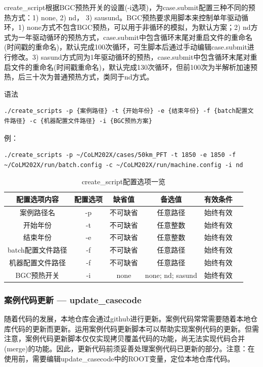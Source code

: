 create\_script根据BGC预热开关的设置(-i选项)，为case.submit配置三种不同的预热方式：1) none, 2) nd， 3) sausund。BGC预热要求用脚本来控制单年驱动循环，1) none方式不包含BGC预热，可以用于非循环的模拟，为默认方案；2) nd方式为一年驱动循环的预热方式，case.submit中包含循环末尾对重启文件的重命名(时间戳的重命名)，默认完成100次循环，可生脚本后通过手动编辑case.submit进行修改。3) sasund方式同为1年驱动循环的预热，case.submit中包含循环末尾对重启文件的重命名(时间戳重命名)，默认完成130次循环，但前100次为半解析加速预热，后三十次为普通预热方式，类同于nd方式。

语法
\begin{lstlisting}[xleftmargin=2.5em]
./create_scripts -p {案例路径} -t {开始年份} -e {结束年份} -f {batch配置文件路径} -c {机器配置文件路径} -i {BGC预热方案}
\end{lstlisting}

例：
\begin{lstlisting}[xleftmargin=2.5em]
./create_scripts -p ~/CoLM202X/cases/50km_PFT -t 1850 -e 1850 -f ~/CoLM202X/run/batch.config -c ~/CoLM202X/run/machine.config -i nd
\end{lstlisting}

\begin{table}[!htbp]
\renewcommand{\arraystretch}{1.5}
\centering
\caption{create\_script配置选项一览}\label{tab:createscript_option}
\begin{tabular}{
cccccc} \toprule
\textbf{配置选项内容} & \textbf{配置选项} & \textbf{缺省值} & \textbf{备选值} & \textbf{有效条件}\\ \midrule
案例路径名 & -p & 不可缺省 & 任意路径 & 始终有效 \\
开始年份 & -t & 不可缺省 & 任意整数 & 始终有效\\
结束年份 & -e & 不可缺省 & 任意整数 & 始终有效\\
batch配置文件路径 & -f & 不可缺省 & 任意路径 & 始终有效 \\
机器配置文件路径 & -f & 不可缺省 & 任意路径 & 始终有效 \\
BGC预热开关 & -i &none & none; nd; sasund& 始终有效 \\
\bottomrule
\end{tabular}
\end{table}

\subsubsection{案例代码更新 --- update\_casecode}

随着代码的发展，本地仓库会通过github进行更新。案例代码常常需要随着本地仓库代码的更新而更新。运用案例代码更新脚本可以帮助实现案例代码的更新。但需注意，案例代码更新脚本仅仅实现拷贝覆盖代码的功能，尚无法实现代码合并(merge)的功能。因此，更新代码前须妥善处理案例代码已更新的部分。注意：在使用前，需要编辑update\_casecode中的ROOT变量，定位本地仓库代码。

